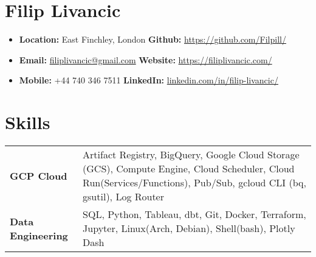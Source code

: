 \documentclass[a4paper, 10pt]{article}
\date{}
\begin{document}
\vspace*{-7.5mm}

\section*{Filip Livancic}
\vspace{-2.5mm}

{\small
\begin{itemize}[itemsep=0.0em]
    \item[] \faMapO \hspace{1mm} \textbf{Location:} \hspace{0.2mm}East Finchley, London 
        \hspace{55.5mm} \faGithub \hspace{2mm} \textbf{Github:} \hspace{2,5mm} \url{https://github.com/Filpill/}
    \item[] \faEnvelope \hspace{1.6mm} \textbf{Email:} \hspace{3.5mm} \href{mailto:filiplivancic@gmail.com}{filiplivancic@gmail.com} 
        \hspace{52.3mm} \faGlobe \hspace{2mm} \textbf{Website:} \hspace{1.2mm} \url{https://filiplivancic.com/}
    \item[] \faPhone \hspace{2.2mm} \textbf{Mobile:} \hspace{1.5mm} +44 740 346 7511
        \hspace{59.4mm} \faLinkedinSquare \hspace{2mm} \textbf{LinkedIn:} \hspace{0.5mm}\url{linkedin.com/in/filip-livancic/}
\end{itemize}
}

\vspace{-4.5mm}
\section*{Skills}
\vspace{-7.5mm}

\begin{table}[h!]
\centering
\renewcommand{\arraystretch}{1.2}
\begin{tabular}{@{} l p{16cm} @{}}
  \textbf{GCP Cloud} & Artifact Registry, BigQuery, Google Cloud Storage (GCS), Compute Engine, Cloud Scheduler, Cloud Run(Services/Functions), Pub/Sub, gcloud CLI (bq, gsutil), Log Router \\
  \textbf{Data Engineering} & SQL, Python, Tableau, dbt, Git, Docker, Terraform, Jupyter, Linux(Arch, Debian), Shell(bash), Plotly Dash \\
\end{tabular}
\end{table}
\end{document}
